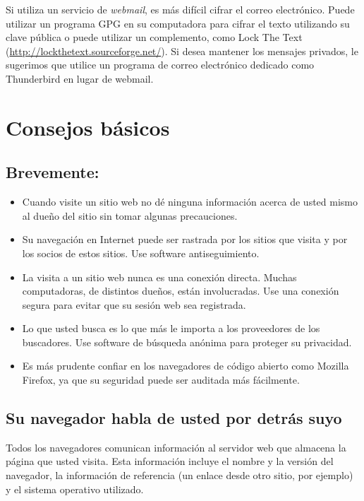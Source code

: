 \documentclass[10pt,a5paper,twoside,,]{book}
\providecommand{\tightlist}{%
  \setlength{\itemsep}{0pt}\setlength{\parskip}{0pt}}
\begin{document}
Si utiliza un servicio de \emph{webmail}, es más difícil cifrar el
correo electrónico. Puede utilizar un programa GPG en su computadora
para cifrar el texto utilizando su clave pública o puede utilizar un
complemento, como Lock The Text
(\url{http://lockthetext.sourceforge.net/}). Si desea mantener los
mensajes privados, le sugerimos que utilice un programa de correo
electrónico dedicado como Thunderbird en lugar de webmail.

\chapter{Consejos básicos}\label{consejos-buxe1sicos-1}

\section{Brevemente:}\label{brevemente-1}

\begin{itemize}
\tightlist
\item
  Cuando visite un sitio web no dé ninguna información acerca de usted
  mismo al dueño del sitio sin tomar algunas precauciones.
\item
  Su navegación en Internet puede ser rastrada por los sitios que visita
  y por los socios de estos sitios. Use software antiseguimiento.
\item
  La visita a un sitio web nunca es una conexión directa. Muchas
  computadoras, de distintos dueños, están involucradas. Use una
  conexión segura para evitar que su sesión web sea registrada.
\item
  Lo que usted busca es lo que más le importa a los proveedores de los
  buscadores. Use software de búsqueda anónima para proteger su
  privacidad.
\item
  Es más prudente confiar en los navegadores de código abierto como
  Mozilla Firefox, ya que su seguridad puede ser auditada más
  fácilmente.
\end{itemize}

\section{Su navegador habla de usted por detrás
suyo}\label{su-navegador-habla-de-usted-por-detruxe1s-suyo}

Todos los navegadores comunican información al servidor web que almacena
la página que usted visita. Esta información incluye el nombre y la
versión del navegador, la información de referencia (un enlace desde
otro sitio, por ejemplo) y el sistema operativo utilizado.
\end{document}
